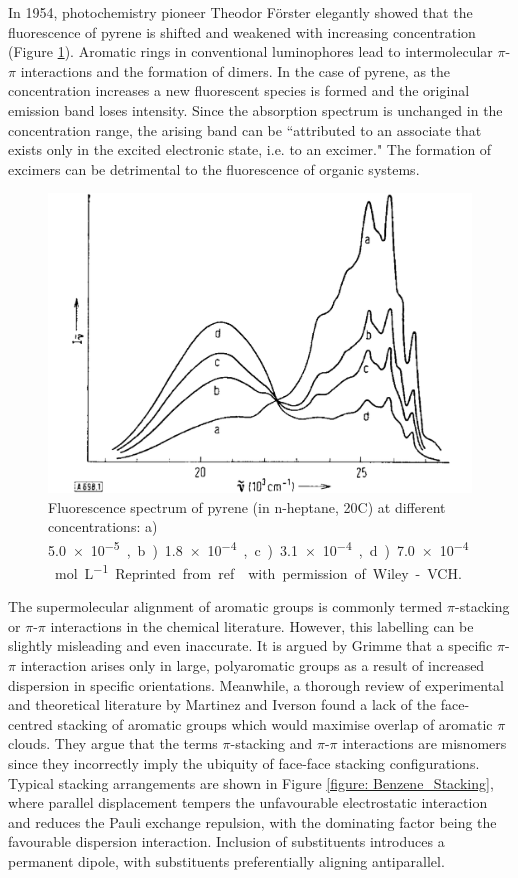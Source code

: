 In 1954, photochemistry pioneer Theodor F\"{o}rster elegantly showed that the fluorescence of pyrene is shifted and weakened with increasing concentration (Figure \ref{figure: Forster_Spectra}).\cite{Forster1954,Forster1969} Aromatic rings in conventional luminophores lead to intermolecular $\pi$-$\pi$ interactions and the formation of dimers. In the case of pyrene, as the concentration increases a new fluorescent species is formed and the original emission band loses intensity. Since the absorption spectrum is unchanged in the concentration range, the arising band can be ``attributed to an associate that exists only in the excited electronic state, i.e. to an excimer."\cite{Forster1969} The formation of excimers can be detrimental to the fluorescence of organic systems.
\begin{figure}[t]
\centering
  \includegraphics[width=0.6\linewidth]{1Intro/Forster_Spectra.pdf}
  \caption[Fluorescence spectrum of pyrene]{Fluorescence spectrum of pyrene (in n-heptane, 20\degree{}C) at different concentrations: a) \SI{5.0e-5}, b) \SI{1.8e-4}, c) \SI{3.1e-4}, d) \SI{7.0e-4}{mol L^{-1}}. Reprinted from ref.~ with permission of Wiley-VCH.}
  \label{figure: Forster_Spectra}
\end{figure}

The supermolecular alignment of aromatic groups is commonly termed $\pi$-stacking or $\pi$-$\pi$ interactions in the chemical literature. However, this labelling can be slightly misleading and even inaccurate.\cite{Grimme2008,Martinez2012} It  is argued by Grimme that a specific $\pi$-$\pi$ interaction arises only in large, polyaromatic groups as a result of increased dispersion in specific orientations.\cite{Grimme2008} Meanwhile, a thorough review of experimental and theoretical literature by Martinez and Iverson found a lack of the face-centred stacking of aromatic groups which would maximise overlap of aromatic $\pi$ clouds.\cite{Martinez2012} They argue that the terms $\pi$-stacking and $\pi$-$\pi$ interactions are misnomers since they incorrectly imply the ubiquity of face-face stacking configurations. Typical stacking arrangements are shown in Figure \ref{figure: Benzene_Stacking}, where parallel displacement tempers the unfavourable electrostatic interaction and reduces the Pauli exchange repulsion, with the dominating factor being the favourable dispersion interaction. Inclusion of substituents introduces a permanent dipole, with substituents preferentially aligning antiparallel.\cite{Martinez2012}

